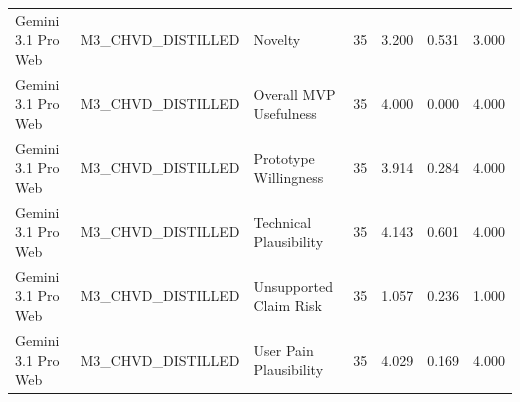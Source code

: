 \documentclass[10pt]{article}
\begin{document}
\begin{landscape}
\begin{longtable}{lllrrrr}
Gemini 3.1 Pro Web & M3\_CHVD\_DISTILLED & Novelty & 35 & 3.200 & 0.531 & 3.000 \\
Gemini 3.1 Pro Web & M3\_CHVD\_DISTILLED & Overall MVP Usefulness & 35 & 4.000 & 0.000 & 4.000 \\
Gemini 3.1 Pro Web & M3\_CHVD\_DISTILLED & Prototype Willingness & 35 & 3.914 & 0.284 & 4.000 \\
Gemini 3.1 Pro Web & M3\_CHVD\_DISTILLED & Technical Plausibility & 35 & 4.143 & 0.601 & 4.000 \\
Gemini 3.1 Pro Web & M3\_CHVD\_DISTILLED & Unsupported Claim Risk & 35 & 1.057 & 0.236 & 1.000 \\
Gemini 3.1 Pro Web & M3\_CHVD\_DISTILLED & User Pain Plausibility & 35 & 4.029 & 0.169 & 4.000 \\
\end{longtable}
\end{landscape}
\end{document}
